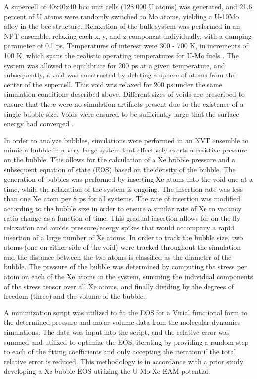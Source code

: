 \documentclass[review]{elsarticle}
\begin{document}
A supercell of 40x40x40 bcc unit cells (128,000 U atoms) was generated, and 21.6 percent of U atoms were randomly switched to Mo atoms, yielding a U-10Mo alloy in the bcc structure. Relaxation of the bulk system was performed in an NPT ensemble, relaxing each x, y, and z component individually, with a damping parameter of 0.1 ps. Temperatures of interest were 300 - 700 K, in increments of 100 K, which spans the realistic operating temperatures for U-Mo fuels \cite{umo_prelim_report2017}. The system was allowed to equilibrate for 200 ps at a given temperature, and subsequently, a void was constructed by deleting a sphere of atoms from the center of the supercell. This void was relaxed for 200 ps under the same simulation conditions described above. Different sizes of voids are prescribed to ensure that there were no simulation artifacts present due to the existence of a single bubble size. Voids were ensured to be sufficiently large that the surface energy had converged \cite{Beeler2020}. 

In order to analyze bubbles, simulations were performed in an NVT ensemble to mimic a bubble in a very large system that effectively exerts a resistive pressure on the bubble. This allows for the calculation of a Xe bubble pressure and a subsequent equation of state (EOS) based on the density of the bubble. The generation of bubbles was performed by inserting Xe atoms into the void one at a time, while the relaxation of the system is ongoing. The insertion rate was less than one Xe atom per 8 ps for all systems. The rate of insertion was modified according to the bubble size in order to ensure a similar rate of Xe to vacancy ratio change as a function of time. This gradual insertion allows for on-the-fly relaxation and avoids pressure/energy spikes that would accompany a rapid insertion of a large number of Xe atoms. In order to track the bubble size, two atoms (one on either side of the void) were tracked throughout the simulation and the distance between the two atoms is classified as the diameter of the bubble. The pressure of the bubble was determined by computing the stress per atom on each of the Xe atoms in the system, summing the individual components of the stress tensor over all Xe atoms, and finally dividing by the degrees of freedom (three) and the volume of the bubble. 

A minimization script was utilized to fit the EOS for a Virial functional form to the determined pressure and molar volume data from the molecular dynamics simulations. The data was input into the script, and the relative error was summed and utilized to optimize the EOS, iterating by providing a random step to each of the fitting coefficients and only accepting the iteration if the total relative error is reduced. This methodology is in accordance with a prior study \cite{Beeler2020} developing a Xe bubble EOS utilizing the U-Mo-Xe EAM potential.
\end{document}
